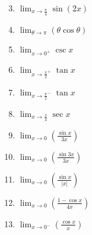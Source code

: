\documentclass[12pt]{article}
\newif\ifans
\begin{document}

\begin{enumerate}
\setcounter{enumi}{2}

\item  $\displaystyle \lim_{x\rightarrow \frac{\pi}{4}} \sin{(2x)}$ 

\ifans{\fbox{1}} \fi

\item $\displaystyle \lim_{\theta \rightarrow \pi}{(\theta \cos{\theta})}$

\ifans{\fbox{$-\pi$}} \fi

\item  $\displaystyle \lim_{x\rightarrow 0^+} \csc x$ 

\ifans{\fbox{$+\infty$}} \fi

\item  $\displaystyle \lim_{x\rightarrow \frac{\pi}{2}^+} \tan x$ 

\ifans{\fbox{$-\infty$}} \fi

\item  $\displaystyle \lim_{x\rightarrow \frac{\pi}{2}^-} \tan x$ 

\ifans{\fbox{$+\infty$}} \fi

\item $\displaystyle \lim_{x \rightarrow \frac{\pi}{4}}{\sec{x}}$

\ifans{\fbox{$\sqrt{2}$}} \fi

\item $\displaystyle \lim_{x\rightarrow 0}{\left(\frac{\sin{x}}{3x}\right)}$ 

\ifans{\fbox{$\displaystyle \frac{1}{3}$}} \fi

\item $\displaystyle \lim_{x\rightarrow 0}{\left(\frac{\sin{3x}}{3x}\right)}$ 

\ifans{\fbox{$\displaystyle 1$}} \fi

\item $\displaystyle \lim_{x\rightarrow 0}{\left(\frac{\sin{x}}{|x|}\right)}$

\ifans{\fbox{DNE}} \fi

\item $\displaystyle \lim_{x\rightarrow 0}{\left(\frac{1-\cos{x}}{4x}\right)}$

\ifans{\fbox{$0$}} \fi

\item $\displaystyle \lim_{x\rightarrow 0^-}{\left(\frac{\cos x}{x}\right)}$ 


\end{enumerate}
\end{document}
